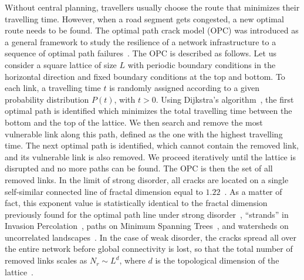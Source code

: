 \documentclass[aps,prl,twocolumn,showpacs,
superscriptaddress,floatfix, 10pt]{revtex4-1}
\begin{document}
Without central planning, travellers usually choose the route that minimizes
their travelling time. However, when a road segment gets congested, a new
optimal route needs to be found. The optimal path crack model (OPC) was
introduced as a general framework to study the resilience of a network
infrastructure to a sequence of optimal path
failures~\cite{Andrade2009,Oliveira2011}. The OPC is described as follows. Let
us consider a square lattice of size $L$ with periodic boundary conditions in
the horizontal direction and fixed boundary conditions at the top and bottom. To
each link, a travelling time $t$ is randomly assigned according to a given
probability distribution $P(t)$, with $t>0$. Using Dijkstra's
algorithm~\cite{Dijkstra1959}, the first optimal path is identified which
minimizes the total travelling time between the bottom and the top of the
lattice. We then search and remove the most vulnerable link along this path,
defined as the one with the highest travelling time. The next optimal path is
identified, which cannot contain the removed link, and its vulnerable link is
also removed. We proceed iteratively until the lattice is disrupted and no more
paths can be found. The OPC is then the set of all removed links. In the limit
of strong disorder, all cracks are located on a single self-similar connected
line of fractal dimension equal to $1.22$~\cite{Andrade2009}. As
a matter of fact, this exponent value is statistically identical to the fractal
dimension previously found for the optimal path line under strong
disorder~\cite{Cieplak1994, Cieplak1996, Porto1997, Porto1999}, ``strands'' in
Invasion Percolation~\cite{Cieplak1994, Cieplak1996}, paths on Minimum Spanning
Trees~\cite{Dobrin2001}, and watersheds on uncorrelated
landscapes~\cite{Oliveira2011}. In the case of weak disorder, the cracks spread
all over the entire network before global connectivity is lost, so that the
total number of removed links scales as $N_{r} \sim L^{d}$, where $d$ is the
topological dimension of the lattice~\cite{Andrade2009}.
\end{document}

